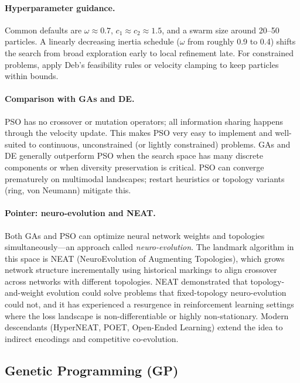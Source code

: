 \paragraph{Hyperparameter guidance.}
Common defaults are \(\omega \approx 0.7\), \(c_1 \approx c_2 \approx 1.5\), and a swarm size around 20--50 particles. A linearly decreasing inertia schedule (\(\omega\) from roughly 0.9 to 0.4) shifts the search from broad exploration early to local refinement late. For constrained problems, apply Deb's feasibility rules or velocity clamping to keep particles within bounds.

\paragraph{Comparison with GAs and DE.}
PSO has no crossover or mutation operators; all information sharing happens through the velocity update. This makes PSO very easy to implement and well-suited to continuous, unconstrained (or lightly constrained) problems. GAs and DE generally outperform PSO when the search space has many discrete components or when diversity preservation is critical. PSO can converge prematurely on multimodal landscapes; restart heuristics or topology variants (ring, von Neumann) mitigate this.

\paragraph{Pointer: neuro-evolution and NEAT.}
Both GAs and PSO can optimize neural network weights and topologies simultaneously---an approach called \emph{neuro-evolution}. The landmark algorithm in this space is NEAT (NeuroEvolution of Augmenting Topologies), which grows network structure incrementally using historical markings to align crossover across networks with different topologies. NEAT demonstrated that topology-and-weight evolution could solve problems that fixed-topology neuro-evolution could not, and it has experienced a resurgence in reinforcement learning settings where the loss landscape is non-differentiable or highly non-stationary. Modern descendants (HyperNEAT, POET, Open-Ended Learning) extend the idea to indirect encodings and competitive co-evolution.

\subsection{Genetic Programming (GP)}
\label{sec:evo_genetic_programming_gp}

